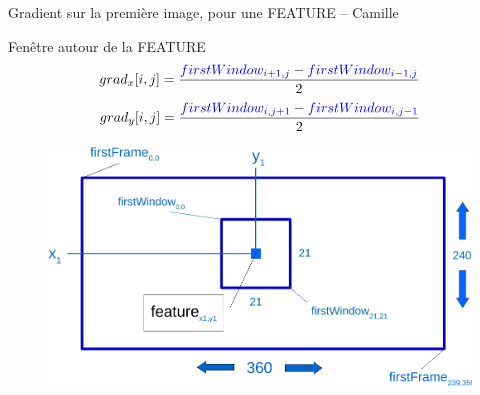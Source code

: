 \documentclass{bredelebeamer}
\begin{document}

\begin{frame}{Gradient sur la première image, pour une FEATURE -- Camille}

	\begin{block}{Fen\^etre autour de la FEATURE}
 $$grad_{x}[i,j] = \frac{\textcolor{blue}{firstWindow_{i+1,j}} - \textcolor{blue}{firstWindow_{i-1,j}}}{2}$$
 $$grad_{y}[i,j] = \frac{\textcolor{blue}{firstWindow_{i,j+1}} - \textcolor{blue}{firstWindow_{i,j-1}}}{2}$$
\end{block}

\begin{figure}
\centering
\includegraphics[scale=0.3]{images/firstFrameWindow.pdf}
\end{figure}

\end{frame}

\end{document}
